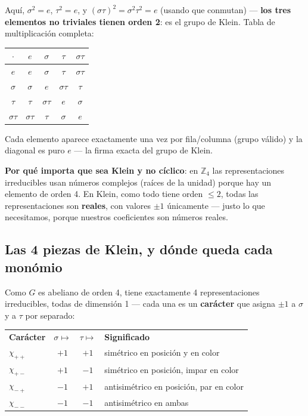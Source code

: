 \documentclass[11pt, a4paper]{article}
\newcommand{\TH}[1]{\cellcolor{cTHbg}\color{white}\textbf{#1}}
\begin{document}
Aqu\'i, $\sigma^2=e$, $\tau^2=e$, y $(\sigma\tau)^2=\sigma^2\tau^2=e$
(usando que conmutan) --- \textbf{los tres elementos no triviales
tienen orden 2}: es el grupo de Klein. Tabla de multiplicaci\'on
completa:

\medskip
\begin{center}
\begin{tabular}{c|cccc}
  $\cdot$ & $e$ & $\sigma$ & $\tau$ & $\sigma\tau$ \\
  \hline
  $e$          & $e$          & $\sigma$      & $\tau$        & $\sigma\tau$ \\
  $\sigma$     & $\sigma$     & $e$           & $\sigma\tau$  & $\tau$ \\
  $\tau$       & $\tau$       & $\sigma\tau$  & $e$           & $\sigma$ \\
  $\sigma\tau$ & $\sigma\tau$ & $\tau$        & $\sigma$      & $e$ \\
\end{tabular}
\end{center}
\medskip

Cada elemento aparece exactamente una vez por fila/columna (grupo
v\'alido) y la diagonal es puro $e$ --- la firma exacta del grupo de
Klein.

\begin{tcolorbox}[quotebox]
  \textbf{Por qu\'e importa que sea Klein y no c\'iclico}: en
  $\mathbb{Z}_4$ las representaciones irreducibles usan n\'umeros
  complejos (ra\'ices de la unidad) porque hay un elemento de orden 4.
  En Klein, como todo tiene orden $\leq2$, todas las representaciones
  son \textbf{reales}, con valores $\pm1$ \'unicamente --- justo lo que
  necesitamos, porque nuestros coeficientes son n\'umeros reales.
\end{tcolorbox}

\subsection{Las 4 piezas de Klein, y d\'onde queda cada mon\'omio}

Como $G$ es abeliano de orden 4, tiene exactamente 4 representaciones
irreducibles, todas de dimensi\'on 1 --- cada una es un \textbf{car\'acter}
que asigna $\pm1$ a $\sigma$ y a $\tau$ por separado:

\medskip
\begin{center}
\begin{tabular}{lccl}
  \TH{Car\'acter} & \TH{$\sigma\mapsto$} & \TH{$\tau\mapsto$} & \TH{Significado} \\[1pt]
  $\chi_{++}$ & $+1$ & $+1$ & sim\'etrico en posici\'on y en color \\
  $\chi_{+-}$ & $+1$ & $-1$ & sim\'etrico en posici\'on, impar en color \\
  $\chi_{-+}$ & $-1$ & $+1$ & antisim\'etrico en posici\'on, par en color \\
  $\chi_{--}$ & $-1$ & $-1$ & antisim\'etrico en ambas \\
\end{tabular}
\end{center}
\medskip
\end{document}
